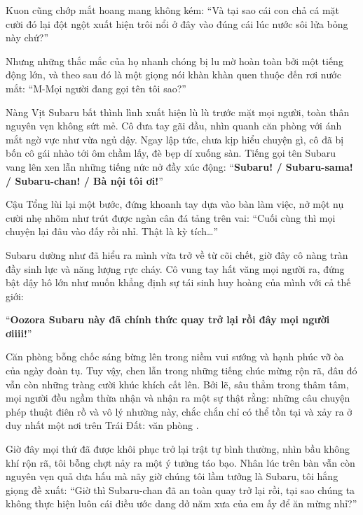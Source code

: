 \documentclass[../main.tex]{subfiles}
\begin{document}
Kuon cũng chớp mắt hoang mang không kém:
``Và tại sao cái con chả cá mặt cười đó lại đột ngột xuất hiện trôi nổi ở đây vào đúng cái lúc nước sôi lửa bỏng này chứ?''

Nhưng những thắc mắc của họ nhanh chóng bị lu mờ hoàn toàn bởi một tiếng động lớn, và theo sau đó là một giọng nói khàn khàn quen thuộc đến rơi nước mắt:
``M-Mọi người đang gọi tên tôi sao?''

Nàng Vịt Subaru bất thình lình xuất hiện lù lù trước mặt mọi người, toàn thân nguyên vẹn không sứt mẻ. Cô đưa tay gãi đầu, nhìn quanh căn phòng với ánh mắt ngờ vực như vừa ngủ dậy. Ngay lập tức, chưa kịp hiểu chuyện gì, cô đã bị bốn cô gái nhào tới ôm chầm lấy, đè bẹp dí xuống sàn. Tiếng gọi tên Subaru vang lên xen lẫn những tiếng nức nở đầy xúc động:
``\textbf{Subaru! / Subaru-sama! / Subaru-chan! / Bà nội tôi ơi!}''

Cậu Tổng lùi lại một bước, đứng khoanh tay dựa vào bàn làm việc, nở một nụ cười nhẹ nhõm như trút được ngàn cân đá tảng trên vai:
``Cuối cùng thì mọi chuyện lại đâu vào đấy rồi nhỉ. Thật là kỳ tích\dots''

Subaru dường như đã hiểu ra mình vừa trở về từ cõi chết, giờ đây cô nàng tràn đầy sinh lực và năng lượng rực cháy. Cô vung tay hất văng mọi người ra, đứng bật dậy hô lớn như muốn khẳng định sự tái sinh huy hoàng của mình với cả thế giới:

\begin{center}
  ``\textbf{Oozora Subaru này đã chính thức quay trở lại rồi đây mọi người ơiiii!}''
\end{center}


Căn phòng bỗng chốc sáng bừng lên trong niềm vui sướng và hạnh phúc vỡ òa của ngày đoàn tụ. Tuy vậy, chen lẫn trong những tiếng chúc mừng rộn rã, đâu đó vẫn còn những tràng cười khúc khích cất lên. Bởi lẽ, sâu thẳm trong thâm tâm, mọi người đều ngầm thừa nhận và nhận ra một sự thật rằng: những câu chuyện phép thuật điên rồ và vô lý nhường này, chắc chắn chỉ có thể tồn tại và xảy ra ở duy nhất một nơi trên Trái Đất: văn phòng \hll.

\omk


Giờ đây mọi thứ đã được khôi phục trở lại trật tự bình thường, nhìn bầu không khí rộn rã, tôi bỗng chợt nảy ra một ý tưởng táo bạo. Nhân lúc trên bàn vẫn còn nguyên vẹn quả dưa hấu mà nãy giờ chúng tôi lầm tưởng là Subaru, tôi hắng giọng đề xuất:
``Giờ thì Subaru-chan đã an toàn quay trở lại rồi, tại sao chúng ta không thực hiện luôn cái điều ước dang dở năm xưa của em ấy để ăn mừng nhỉ?''
\end{document}
